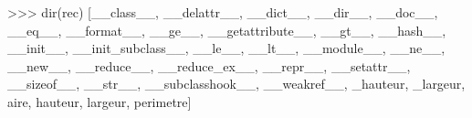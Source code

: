 \documentclass[
  letterpaper,
  DIV=11,
  numbers=noendperiod]{scrartcl}
\newenvironment{Shaded}{\begin{snugshade}}{\end{snugshade}}
\newcommand{\BuiltInTok}[1]{\textcolor[rgb]{0.00,0.23,0.31}{#1}}
\newcommand{\NormalTok}[1]{\textcolor[rgb]{0.00,0.23,0.31}{#1}}
\newcommand{\OperatorTok}[1]{\textcolor[rgb]{0.37,0.37,0.37}{#1}}
\newcommand{\StringTok}[1]{\textcolor[rgb]{0.13,0.47,0.30}{#1}}
\begin{document}
\begin{Shaded}
\begin{Highlighting}[]
\OperatorTok{\textgreater{}\textgreater{}\textgreater{}} \BuiltInTok{dir}\NormalTok{(rec)}
\NormalTok{[}\StringTok{\textquotesingle{}\_\_class\_\_\textquotesingle{}}\NormalTok{,}
 \StringTok{\textquotesingle{}\_\_delattr\_\_\textquotesingle{}}\NormalTok{,}
 \StringTok{\textquotesingle{}\_\_dict\_\_\textquotesingle{}}\NormalTok{,}
 \StringTok{\textquotesingle{}\_\_dir\_\_\textquotesingle{}}\NormalTok{,}
 \StringTok{\textquotesingle{}\_\_doc\_\_\textquotesingle{}}\NormalTok{,}
 \StringTok{\textquotesingle{}\_\_eq\_\_\textquotesingle{}}\NormalTok{,}
 \StringTok{\textquotesingle{}\_\_format\_\_\textquotesingle{}}\NormalTok{,}
 \StringTok{\textquotesingle{}\_\_ge\_\_\textquotesingle{}}\NormalTok{,}
 \StringTok{\textquotesingle{}\_\_getattribute\_\_\textquotesingle{}}\NormalTok{,}
 \StringTok{\textquotesingle{}\_\_gt\_\_\textquotesingle{}}\NormalTok{,}
 \StringTok{\textquotesingle{}\_\_hash\_\_\textquotesingle{}}\NormalTok{,}
 \StringTok{\textquotesingle{}\_\_init\_\_\textquotesingle{}}\NormalTok{,}
 \StringTok{\textquotesingle{}\_\_init\_subclass\_\_\textquotesingle{}}\NormalTok{,}
 \StringTok{\textquotesingle{}\_\_le\_\_\textquotesingle{}}\NormalTok{,}
 \StringTok{\textquotesingle{}\_\_lt\_\_\textquotesingle{}}\NormalTok{,}
 \StringTok{\textquotesingle{}\_\_module\_\_\textquotesingle{}}\NormalTok{,}
 \StringTok{\textquotesingle{}\_\_ne\_\_\textquotesingle{}}\NormalTok{,}
 \StringTok{\textquotesingle{}\_\_new\_\_\textquotesingle{}}\NormalTok{,}
 \StringTok{\textquotesingle{}\_\_reduce\_\_\textquotesingle{}}\NormalTok{,}
 \StringTok{\textquotesingle{}\_\_reduce\_ex\_\_\textquotesingle{}}\NormalTok{,}
 \StringTok{\textquotesingle{}\_\_repr\_\_\textquotesingle{}}\NormalTok{,}
 \StringTok{\textquotesingle{}\_\_setattr\_\_\textquotesingle{}}\NormalTok{,}
 \StringTok{\textquotesingle{}\_\_sizeof\_\_\textquotesingle{}}\NormalTok{,}
 \StringTok{\textquotesingle{}\_\_str\_\_\textquotesingle{}}\NormalTok{,}
 \StringTok{\textquotesingle{}\_\_subclasshook\_\_\textquotesingle{}}\NormalTok{,}
 \StringTok{\textquotesingle{}\_\_weakref\_\_\textquotesingle{}}\NormalTok{,}
 \StringTok{\textquotesingle{}\_hauteur\textquotesingle{}}\NormalTok{,}
 \StringTok{\textquotesingle{}\_largeur\textquotesingle{}}\NormalTok{,}
 \StringTok{\textquotesingle{}aire\textquotesingle{}}\NormalTok{,}
 \StringTok{\textquotesingle{}hauteur\textquotesingle{}}\NormalTok{,}
 \StringTok{\textquotesingle{}largeur\textquotesingle{}}\NormalTok{,}
 \StringTok{\textquotesingle{}perimetre\textquotesingle{}}\NormalTok{]}
\end{Highlighting}
\end{Shaded}
\end{document}
